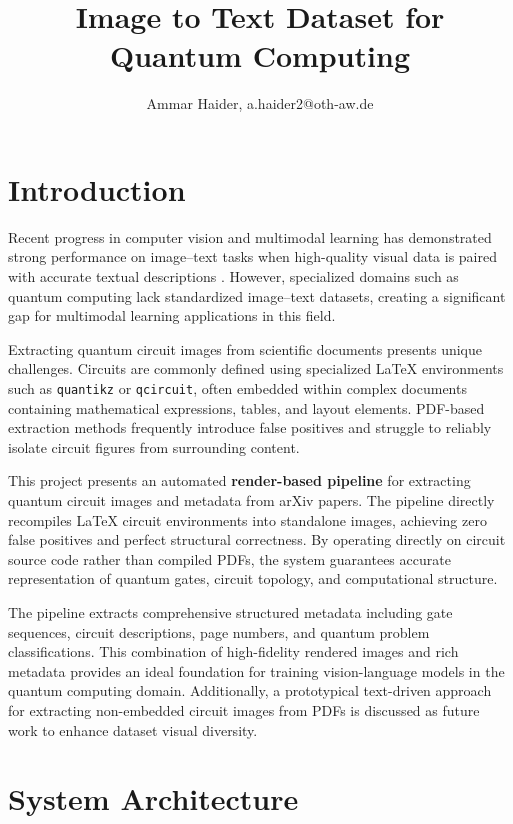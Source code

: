 \documentclass[9pt,a4paper,twoside]{rho-class/rho}
\title{Image to Text Dataset for Quantum Computing}
\author[1,$\dagger$]{Ammar Haider, a.haider2@oth-aw.de}
\affil[1]{OTH Amberg-Weiden, Study programme "Master of Artificial Intelligence for Industrial Applications"}
\begin{document}
	
    \maketitle
    

\section{Introduction}

Recent progress in computer vision and multimodal learning has demonstrated strong performance on image--text tasks when high-quality visual data is paired with accurate textual descriptions \cite{radford2021learning}. However, specialized domains such as quantum computing lack standardized image--text datasets, creating a significant gap for multimodal learning applications in this field.

Extracting quantum circuit images from scientific documents presents unique challenges. Circuits are commonly defined using specialized \LaTeX{} environments such as \texttt{quantikz} or \texttt{qcircuit}, often embedded within complex documents containing mathematical expressions, tables, and layout elements. PDF-based extraction methods frequently introduce false positives and struggle to reliably isolate circuit figures from surrounding content.

This project presents an automated \textbf{render-based pipeline} for extracting quantum circuit images and metadata from arXiv papers. The pipeline directly recompiles \LaTeX{} circuit environments into standalone images, achieving zero false positives and perfect structural correctness. By operating directly on circuit source code rather than compiled PDFs, the system guarantees accurate representation of quantum gates, circuit topology, and computational structure.

The pipeline extracts comprehensive structured metadata including gate sequences, circuit descriptions, page numbers, and quantum problem classifications. This combination of high-fidelity rendered images and rich metadata provides an ideal foundation for training vision-language models in the quantum computing domain. Additionally, a prototypical text-driven approach for extracting non-embedded circuit images from PDFs is discussed as future work to enhance dataset visual diversity.

\section{System Architecture}
\end{document}
